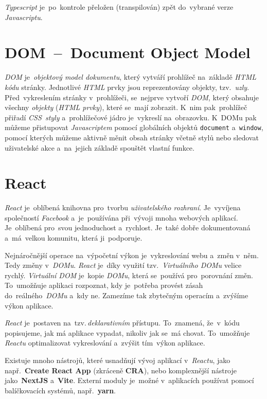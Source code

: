 \documentclass[11pt,a4paper]{report}
\begin{document}
            \emph{Typescript} je~po~kontrole přeložen (transpilován) zpět do~vybrané verze \emph{Javascriptu}. \cite[Get started/TypeScript for the New Programmer]{TypeScript}

        \section{DOM~--~Document Object Model}
            \emph{DOM} je~\emph{objektový model dokumentu}, který vytváří prohlížeč na~základě \emph{HTML kódu} stránky. Jednotlivé \emph{HTML} prvky jsou reprezentovány objekty, tzv.~\emph{uzly}. Před~vykreslením stránky v~prohlížeči, se~nejprve vytvoří \emph{DOM}, který obsahuje všechny \emph{objekty} (\emph{HTML prvky}), které se~mají zobrazit. K~nim pak~prohlížeč přiřadí \emph{CSS~styly} a~prohlížečové jádro je~vykreslí na~obrazovku. K~DOMu pak můžeme přistupovat \emph{Javascriptem} pomocí globálních objektů \texttt{document} a~\texttt{window}, pomocí kterých můžeme aktivně měnit obsah stránky včetně stylů nebo sledovat uživatelské akce a~na~jejich základě spouštět vlastní funkce.\cite[2.1.01]{kantor_javascript}
        
        \section{React}
            \emph{React} je~oblíbená knihovna pro~tvorbu \emph{uživatelského rozhraní}. Je~vyvíjena společností \emph{Facebook} a~je~používána při~vývoji mnoha webových aplikací. Je~oblíbená pro~svou jednoduchost a~rychlost. Je~také dobře dokumentovaná a~má~velkou komunitu, která ji~podporuje.
            
            Nejnáročnější operace na~výpočetní výkon je~vykreslování webu a~změn v~něm. Tedy změny v~\emph{DOMu}. \emph{React} je~díky využití tzv.~\emph{Virtuálního DOMu} velice rychlý. \emph{Virtuální DOM} je~kopie \emph{DOMu}, která se~používá pro~porovnání změn. To~umožňuje aplikaci rozpoznat, kdy je~potřeba provést zásah do~reálného~\emph{DOMu} a~kdy ne. Zamezíme tak zbytečným operacím a~zvýšíme výkon aplikace. \cite{elrom2021react}
            
            \emph{React} je~postaven na~tzv.\,\emph{deklarativním} přístupu. To~znamená, že~v~kódu popisujeme, jak má aplikace vypadat, nikoliv jak se~má chovat. To~umožňuje \emph{Reactu} optimalizovat vykreslování a~zvýšit tím~výkon aplikace.
            
            Existuje mnoho nástrojů, které usnadňují vývoj aplikací v~\emph{Reactu}, jako např.~\textbf{Create React App} (zkráceně \textbf{CRA}), nebo komplexnější nástroje jako~\textbf{NextJS} a~\textbf{Vite}. Externí moduly je~možné v~aplikacích používat pomocí balíčkovacích systémů, např.~\textbf{yarn}.
\end{document}
